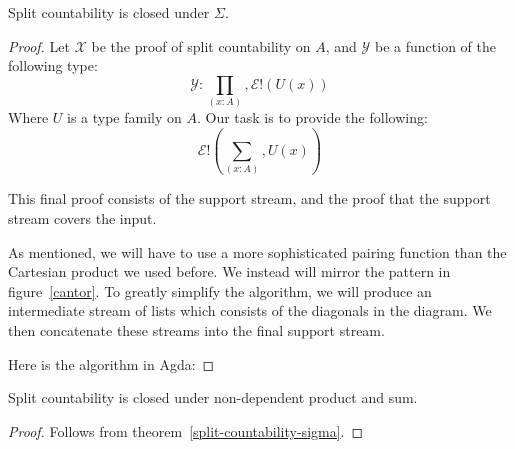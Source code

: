 \begin{theorem} \label{split-countability-sigma}
  Split countability is closed under \(\Sigma\).
\end{theorem}
\begin{proof}
  Let \(\mathcal{X}\) be the proof of split countability on \(A\), and
  \(\mathcal{Y}\) be a function of the following type:
  \begin{equation}
    \mathcal{Y} : \prod_{(x : A)} , \mathcal{E}!(U(x))
  \end{equation}
  Where \(U\) is a type family on \(A\).
  Our task is to provide the following:
  \begin{equation}
    \mathcal{E}!\left(\sum_{(x : A)} , U(x)\right)
  \end{equation}

  This final proof consists of the support stream, and the proof that the
  support stream covers the input.

  As mentioned, we will have to use a more sophisticated pairing function than
  the Cartesian product we used before.
  We instead will mirror the pattern in figure~\ref{cantor}.
  To greatly simplify the algorithm, we will produce an intermediate stream of
  lists which consists of the diagonals in the diagram.
  We then concatenate these streams into the final support stream.

  Here is the algorithm in Agda:
\end{proof}
\begin{lemma}
  Split countability is closed under non-dependent product and sum.
\end{lemma}
\begin{proof}
  Follows from theorem~\ref{split-countability-sigma}.
\end{proof}
